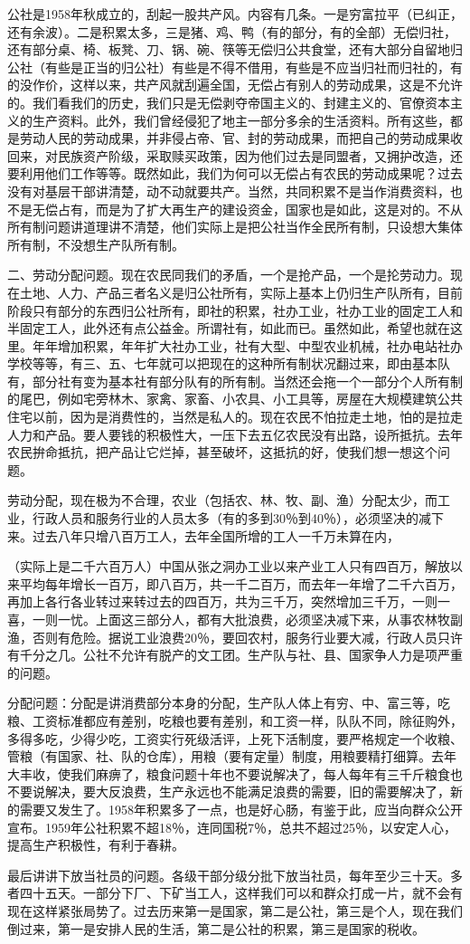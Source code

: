 公社是1958年秋成立的，刮起一股共产风。内容有几条。一是穷富拉平（已纠正，还有余波）。二是积累太多，三是猪、鸡、鸭（有的部分，有的全部）无偿归社，还有部分桌、椅、板凳、刀、锅、碗、筷等无偿归公共食堂，还有大部分自留地归公社（有些是正当的归公社）有些是不得不借用，有些是不应当归社而归社的，有的没作价，这样以来，共产风就刮遍全国，无偿占有别人的劳动成果，这是不允许的。我们看我们的历史，我们只是无偿剥夺帝国主义的、封建主义的、官僚资本主义的生产资料。此外，我们曾经侵犯了地主一部分多余的生活资料。所有这些，都是劳动人民的劳动成果，并非侵占帝、官、封的劳动成果，而把自己的劳动成果收回来，对民族资产阶级，采取赎买政策，因为他们过去是同盟者，又拥护改造，还要利用他们工作等等。既然如此，我们为何可以无偿占有农民的劳动成果呢？过去没有对基层干部讲清楚，动不动就要共产。当然，共同积累不是当作消费资料，也不是无偿占有，而是为了扩大再生产的建设资金，国家也是如此，这是对的。不从所有制问题讲道理讲不清楚，他们实际上是把公社当作全民所有制，只设想大集体所有制，不没想生产队所有制。

二、劳动分配问题。现在农民同我们的矛盾，一个是抢产品，一个是抡劳动力。现在土地、人力、产品三者名义是归公社所有，实际上基本上仍归生产队所有，目前阶段只有部分的东西归公社所有，即社的积累，社办工业，社办工业的固定工人和半固定工人，此外还有点公益金。所谓社有，如此而已。虽然如此，希望也就在这里。年年增加积累，年年扩大社办工业，社有大型、中型农业机械，社办电站社办学校等等，有三、五、七年就可以把现在的这种所有制状况翻过来，即由基本队有，部分社有变为基本社有部分队有的所有制。当然还会拖一个一部分个人所有制的尾巴，例如宅旁林木、家禽、家畜、小农具、小工具等，房屋在大规模建筑公共住宅以前，因为是消费性的，当然是私人的。现在农民不怕拉走土地，怕的是拉走人力和产品。要人要钱的积极性大，一压下去五亿农民没有出路，设所抵抗。去年农民拚命抵抗，把产品让它烂掉，甚至破坏，这抵抗的好，使我们想一想这个问题。

劳动分配，现在极为不合理，农业（包括农、林、牧、副、渔）分配太少，而工业，行政人员和服务行业的人员太多（有的多到30％到40％），必须坚决的减下来。过去八年只增八百万工人，去年全国所增的工人一千万未算在内，

（实际上是二千六百万人）中国从张之洞办工业以来产业工人只有四百万，解放以来平均每年增长一百万，即八百万，共一千二百万，而去年一年增了二千六百万，再加上各行各业转过来转过去的四百万，共为三千万，突然增加三千万，一则一喜，一则一忧。上面这三部分人，都有大批浪费，必须坚决减下来，从事农林牧副渔，否则有危险。据说工业浪费20％，要回农村，服务行业要大减，行政人员只许有千分之几。公社不允许有脱产的文工团。生产队与社、县、国家争人力是项严重的问题。

分配问题：分配是讲消费部分本身的分配，生产队人体上有穷、中、富三等，吃粮、工资标准都应有差别，吃粮也要有差别，和工资一样，队队不同，除征购外，多得多吃，少得少吃，工资实行死级活评，上死下活制度，要严格规定一个收粮、管粮（有国家、社、队的仓库），用粮（要有定量）制度，用粮要精打细算。去年大丰收，使我们麻痹了，粮食问题十年也不要说解决了，每人每年有三千斤粮食也不要说解决，要大反浪费，生产永远也不能满足浪费的需要，旧的需要解决了，新的需要又发生了。1958年积累多了一点，也是好心肠，有鉴于此，应当向群众公开宣布。1959年公社积累不超18％，连同国税7％，总共不超过25％，以安定人心，提高生产积极性，有利于春耕。

最后讲讲下放当社员的问题。各级干部分级分批下放当社员，每年至少三十天。多者四十五天。一部分下厂、下矿当工人，这样我们可以和群众打成一片，就不会有现在这样紧张局势了。过去历来第一是国家，第二是公社，第三是个人，现在我们倒过来，第一是安排人民的生活，第二是公社的积累，第三是国家的税收。


